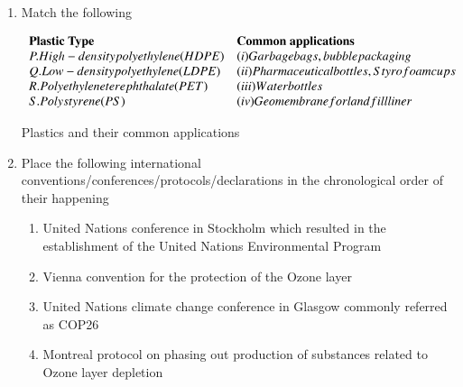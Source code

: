 \documentclass[journal,12pt,onecolumn]{IEEEtran}
\theoremstyle{remark}
\begin{document}
\begin{enumerate}
\newpage

\item Match the following

\begin{center}
\begin{table}[h!]
\centering
\[
\begin{array}{ l l }

\textbf{Plastic Type} & \textbf{Common applications} \\

P. High-density polyethylene (HDPE)   & (i) Garbage bags, bubble packaging \\
Q. Low-density polyethylene (LDPE)    & (ii) Pharmaceutical bottles, Styrofoam cups \\
R. Polyethylene terephthalate (PET)   & (iii) Water bottles \\
S. Polystyrene (PS)                   & (iv) Geomembrane for landfill liner \\

\end{array}
\]
\caption{Plastics and their common applications}
\label{tab:plastics}
\end{table}

\end{center}

\begin{enumerate}
\end{enumerate}
\hfill{}
\item Place the following international conventions/conferences/protocols/declarations 
in the chronological order  of their happening

\begin{enumerate}[label=\roman*.]
\item United Nations conference in Stockholm which resulted in the establishment of the United Nations Environmental Program 
\item Vienna convention for the protection of the Ozone layer
\item United Nations climate change conference in Glasgow commonly referred as COP26
\item Montreal protocol on phasing out production of substances related to Ozone layer depletion
\end{enumerate}


\end{enumerate}
\end{document}
